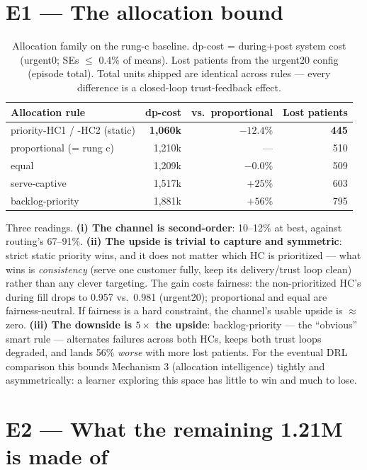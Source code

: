 \documentclass[11pt]{article}
\begin{document}
\section{E1 --- The allocation bound}

\begin{table}[h]
\centering\small
\caption{Allocation family on the rung-c baseline. dp-cost = during+post system cost
(urgent0; SEs $\le$ 0.4\% of means). Lost patients from the urgent20 config (episode total).
Total units shipped are identical across rules --- every difference is a closed-loop
trust-feedback effect.}
\begin{tabular}{lrrr}
\toprule
\textbf{Allocation rule} & \textbf{dp-cost} & \textbf{vs.\ proportional} & \textbf{Lost patients} \\
\midrule
priority-HC1 / -HC2 (static) & \textbf{1{,}060k} & $\mathbf{-12.4\%}$ & \textbf{445} \\
proportional (= rung c) & 1{,}210k & --- & 510 \\
equal & 1{,}209k & $-0.0\%$ & 509 \\
serve-captive & 1{,}517k & $+25\%$ & 603 \\
backlog-priority & 1{,}881k & $+56\%$ & 795 \\
\bottomrule
\end{tabular}
\end{table}

Three readings. \textbf{(i) The channel is second-order}: 10--12\% at best, against routing's
67--91\%. \textbf{(ii) The upside is trivial to capture and symmetric}: strict static priority
wins, and it does not matter which HC is prioritized --- what wins is \emph{consistency}
(serve one customer fully, keep its delivery/trust loop clean) rather than any clever
targeting. The gain costs fairness: the non-prioritized HC's during fill drops to 0.957 vs.\
0.981 (urgent20); proportional and equal are fairness-neutral. If fairness is a hard
constraint, the channel's usable upside is $\approx$ zero. \textbf{(iii) The downside is
$5\times$ the upside}: backlog-priority --- the ``obvious'' smart rule --- alternates failures
across both HCs, keeps both trust loops degraded, and lands 56\% \emph{worse} with more lost
patients. For the eventual DRL comparison this bounds Mechanism 3 (allocation intelligence)
tightly and asymmetrically: a learner exploring this space has little to win and much to lose.

\section{E2 --- What the remaining 1.21M is made of}
\end{document}
